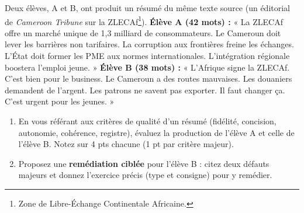 \documentclass[11pt]{article}
\begin{document}
\begin{exercice}
Deux élèves, A et B, ont produit un résumé du même texte source (un éditorial de \textit{Cameroon Tribune} sur la ZLECAf\footnote{Zone de Libre-Échange Continentale Africaine.}).
\textbf{Élève A (42 mots) :} « La ZLECAf offre un marché unique de 1,3 milliard de consommateurs. Le Cameroun doit lever les barrières non tarifaires. La corruption aux frontières freine les échanges. L'État doit former les PME aux normes internationales. L'intégration régionale boostera l'emploi jeune. »
\textbf{Élève B (38 mots) :} « L'Afrique signe la ZLECAf. C'est bien pour le business. Le Cameroun a des routes mauvaises. Les douaniers demandent de l'argent. Les patrons ne savent pas exporter. Il faut changer ça. C'est urgent pour les jeunes. »
\begin{enumerate}
    \item En vous référant aux critères de qualité d'un résumé (fidélité, concision, autonomie, cohérence, registre), évaluez la production de l'élève A et celle de l'élève B. Notez sur 4 pts chacune (1 pt par critère majeur).
    \item Proposez une \textbf{remédiation ciblée} pour l'élève B : citez deux défauts majeurs et donnez l'exercice précis (type et consigne) pour y remédier.
\end{enumerate}
\end{exercice}
\end{document}
